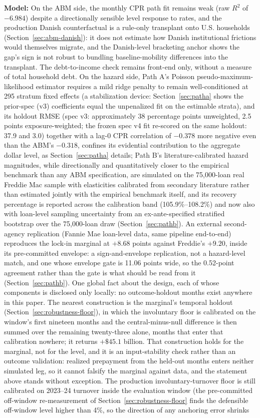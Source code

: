 \documentclass[12pt]{article}
\begin{document}
\textbf{Model:} On the ABM side, the monthly CPR path fit remains weak (raw $R^2$ of $-6.984$) despite a directionally sensible level response to rates, and the production Danish counterfactual is a rule-only transplant onto U.S. households (Section~\ref{sec:abm-danish}): it does not estimate how Danish institutional frictions would themselves migrate, and the Danish-level bracketing anchor shows the gap's sign is not robust to bundling baseline-mobility differences into the transplant. The debt-to-income check remains front-end only, without a measure of total household debt. On the hazard side, Path A's Poisson pseudo-maximum-likelihood estimator requires a mild ridge penalty to remain well-conditioned at 295 stratum fixed effects (a stabilization device: Section~\ref{sec:patha} shows the prior-spec (v3) coefficients equal the unpenalized fit on the estimable strata), and its holdout RMSE (spec v3: approximately 38 percentage points unweighted, 2.5 points exposure-weighted; the frozen spec v4 fit re-scored on the same holdout: 37.9 and 3.0) together with a lag-0 CPR correlation of $-0.378$ more negative even than the ABM's $-0.318$, confines its evidential contribution to the aggregate dollar level, as Section~\ref{sec:patha} details; Path B's literature-calibrated hazard magnitudes, while directionally and quantitatively closer to the empirical benchmark than any ABM specification, are simulated on the 75,000-loan real Freddie Mac sample with elasticities calibrated from secondary literature rather than estimated jointly with the empirical benchmark itself, and its recovery percentage is reported across the calibration band (105.9\%--108.2\%) and now also with loan-level sampling uncertainty from an ex-ante-specified stratified bootstrap over the 75,000-loan draw (Section~\ref{sec:pathb}). An external second-agency replication (Fannie Mae loan-level data, same pipeline end-to-end) reproduces the lock-in marginal at $+8.68$ points against Freddie's $+9.20$, inside its pre-committed envelope: a sign-and-envelope replication, not a hazard-level match, and one whose envelope gate is 11.06 points wide, so the 0.52-point agreement rather than the gate is what should be read from it (Section~\ref{sec:pathb}). One global fact about the design, each of whose components is disclosed only locally: no outcome-holdout months exist anywhere in this paper. The nearest construction is the marginal's temporal holdout (Section~\ref{sec:robustness-floor}), in which the involuntary floor is calibrated on the window's first nineteen months and the central-minus-null difference is then summed over the remaining twenty-three alone, months that enter that calibration nowhere; it returns $+\$45.1$ billion. That construction holds for the marginal, not for the level, and it is an input-stability check rather than an outcome validation: realized prepayment from the held-out months enters neither simulated leg, so it cannot falsify the marginal against data, and the statement above stands without exception. The production involuntary-turnover floor is still calibrated on 2023--24 turnover inside the evaluation window (the pre-committed off-window re-measurement of Section~\ref{sec:robustness-floor} finds the defensible off-window level higher than 4\%, so the direction of any anchoring error shrinks 
\end{document}
